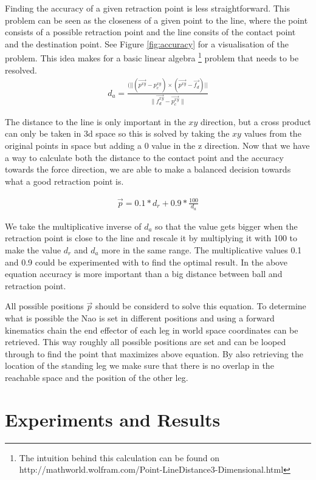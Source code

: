\documentclass[a4paper]{article}
\begin{document}
Finding the accuracy of a given retraction point is less straightforward. This
problem can be seen as the closeness of a given point to the line, where the
point consists of a possible retraction point and the line consits of the
contact point and the destination point. See Figure \ref{fig:accuracy} for a
visualisation of the problem. This idea makes for a basic linear algebra
\footnote{The intuition behind this calculation can be found on http://mathworld.wolfram.com/Point-LineDistance3-Dimensional.html }
problem that needs to be resolved.
\begin{align*}
    d_a = \frac{(||(\vec{p^{xy}} - p_c^{xy}) \times (\vec{p^{xy}} -
    \vec{f_d})||}{\|\vec{f_d^{xy}}- \vec{p_c^{xy}}\|}
\end{align*}

The distance to the line is only important in the $xy$ direction, but a cross
product can only be taken in 3d space so this is solved by taking the $xy$
values from the original points in space but adding a 0 value in the z
direction.
Now that we have a way to calculate both the distance to the contact point and
the accuracy towards the force direction, we are able to make a balanced
decision towards what a good retraction point is.

\begin{align*}
    \vec{p} = 0.1 * d_r + 0.9 * \frac{100}{d_a}
\end{align*}

We take the multiplicative inverse of $d_a$ so that the value gets bigger when the
retraction point is close to the line and rescale it by multiplying it with 100 to
make the value $d_r$ and $d_a$ more in the same range. The multiplicative values
0.1 and 0.9 could be experimented with to find the optimal result. In the above
equation accuracy is more important than a big distance between ball and
retraction point.

All possible positions $\vec{p}$ should be considerd to solve this equation. To
determine what is possible the Nao is set in different positions and using a
forward kinematics chain the end effector of each leg in world space coordinates
can be retrieved. This way roughly all possible positions are set and can be
looped through to find the point that maximizes above equation. By also
retrieving the location of the standing leg we make sure that there is
no overlap in the reachable space and the position of the other leg.

\section{Experiments and Results}
\end{document}
